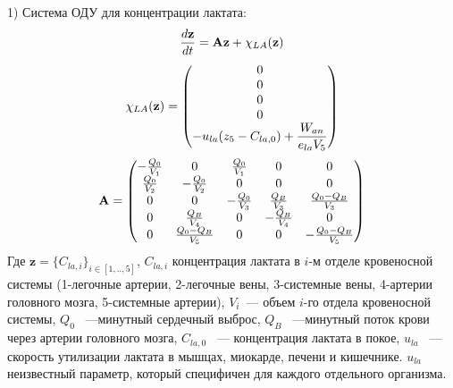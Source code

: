 1) Система ОДУ для концентрации лактата:
\begin{equation}
\frac{d\textbf{z}}{dt}=\textbf{A}\textbf{z}+\mathbf{\chi}_{LA}(\textbf{z})\notag
\end{equation}
\begin{equation}
\mathbf{\chi}_{LA}(\textbf{z})=\begin{pmatrix}
0 \\
0 \\
0 \\
0 \\
\displaystyle -u_{la}(z_{5}-C_{la,0})+\frac{W_{an}}{e_{la}V_{5}}
\end{pmatrix}\notag
\end{equation}
\begin{equation}
\mathbf{A}=\begin{pmatrix}
-\frac{Q_{0}}{V_{1}} & 0 & \frac{Q_{0}}{V_{1}} & 0 & 0 \\
\frac{Q_{0}}{V_{2}} & -\frac{Q_{0}}{V_{2}} & 0 & 0 & 0 \\
0 & 0 & -\frac{Q_{0}}{V_{3}} &  \frac{Q_{B}}{V_{3}} &  \frac{Q_{0}-Q_{B}}{V_{3}} \\
0 & \frac{Q_{B}}{V_{4}} & 0 & -\frac{Q_{B}}{V_{4}} & 0 \\
0 & \frac{Q_{0}-Q_{B}}{V_{5}} & 0 & 0 & -\frac{Q_{0}-Q_{B}}{V_{5}} \\
\end{pmatrix} \notag
\end{equation}
Где $\mathbf{z} = \{ C_{la,i} \}_{i \in [1,..,5]}$, $C_{la,i}$ концентрация лактата в $i$-м отделе кровеносной системы (1-легочные артерии, 2-легочные вены, 3-системные вены, 4-артерии головного мозга, 5-системные артерии), \( V_{i}\)~--- объем \(i\)-го отдела кровеносной системы, \( Q_{0}\) ~---минутный сердечный выброс, \( Q_{B}\) ~---минутный поток крови через артерии головного мозга, \(C_{la,0} \) ~--- концентрация лактата в покое, \(u_{la} \) ~--- скорость утилизации лактата в мышцах, миокарде, печени и кишечнике. \(u_{la} \) неизвестный параметр, который специфичен для каждого отдельного организма.

